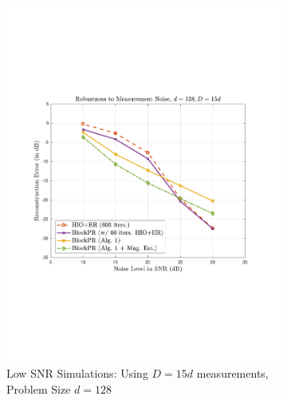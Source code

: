 \begin{figure}[hbtp]
\begin{subfigure}[b]{0.495\textwidth}
\includegraphics[clip=true, trim = 0.75in 2.75in 1in 2.5in,scale=0.45]{pics/robustness_600c}
\caption{Low SNR Simulations: Using $D=15d$ measurements, Problem Size $d=128$}
\label{fig:lowsnr_128}
\end{subfigure}
\hfill
\begin{subfigure}[b]{0.495\textwidth}
\centering

\end{subfigure}
\end{figure}
